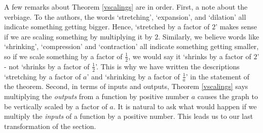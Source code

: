 
\medskip


A few remarks about Theorem \ref{vscalings} are in order.  First, a note about the verbiage.  To the authors, the words `stretching', `expansion', and `dilation' all indicate something getting bigger.  Hence, `stretched by a factor of $2$' makes sense if we are scaling something by multiplying it by $2$.  Similarly, we believe words like `shrinking', `compression' and `contraction' all indicate something getting smaller, so if we scale something by a factor of $\frac{1}{2}$, we would say it `shrinks by a factor of $2$' - not `shrinks by a factor of $\frac{1}{2}$'.  This is why we have written the descriptions `stretching by a factor of $a$' and `shrinking by a factor of $\frac{1}{a}$' in the statement of the theorem.  Second, in terms of inputs and outputs, Theorem \ref{vscalings} says multiplying the \textit{outputs} from a function by positive number $a$ causes the graph to be vertically scaled by a factor of $a$.  It is natural to ask what would happen if we multiply the \textit{inputs} of a function by a positive number.  This leads us to our last transformation of the section.

\smallskip

